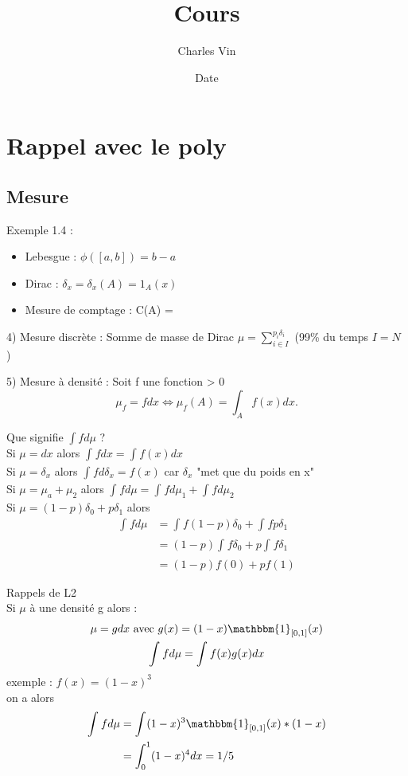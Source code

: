 \documentclass{article}
\title{Cours}
\author{Charles Vin}
\date{Date}
\theoremstyle{plain}%
\theoremstyle{definition}
\theoremstyle{remark}
\begin{document}
\maketitle

\section{Rappel avec le poly}

\subsection{Mesure}
Exemple 1.4 :
\begin{itemize}
    \item Lebesgue :  $ \phi ([a,b]) = b-a $ 
    \item Dirac :  $ \delta_x = \delta_x(A) = 1_A(x)$ 
    \item Mesure de comptage : C(A) =  
\end{itemize}

4) Mesure discrète : Somme de masse de Dirac 
$ \mu = \sum_{i \in I}^{p_i\delta_i} $ (99\% du temps  $ I=N $ )

5) Mesure à densité :
Soit f une fonction > 0 \\ 
\[
    \mu _f = fdx \Leftrightarrow \mu _f(A) = \int_{A} f(x)dx
.\]

Que signifie  $ \int fd \mu  $ ? \\
Si  $ \mu  = dx  $ alors  $ \int_{}^{} fdx = \int_{}^{}f(x)dx$\\
Si  $ \mu  = \delta _x $ alors  $ \int_{}^{}f d \delta _x = f(x)$ car  $ \delta_x  $ "met que du poids en x" \\
Si  $ \mu = \mu _a + \mu _2 $ alors  $ \int_{}^{}f d \mu = \int_{}^{} f d \mu _1 + \int_{}^{} f d \mu _2 $ \\
Si  $ \mu = (1-p) \delta _0 + p \delta _1 $ alors  
\begin{align*}
    \int_{}^{} f d \mu &= \int_{}^{}f (1-p )\delta _0 + \int_{}^{} f p \delta _1 \\
                        &= (1-p)\int_{}^{}f \delta _0 + p \int_{}^{} f \delta _1 \\
                        &= (1-p)f(0) + pf(1)
\end{align*}

Rappels de L2 \\
Si  $ \mu $  à une densité g alors :
\begin{gather*}
    \mu  = gdx \text{ avec } g(x)= (1-x) \mathbbm{1}_{[0,1]}(x) \\
    \int_{}^{}fd \mu  = \int_{}^{} f(x)g(x)dx
\end{gather*}
exemple :  $ f(x) = (1-x)^3 $ \\
on a alors \begin{align*}
    \int_{}^{}fd \mu  &= \int_{}^{} (1-x)^3 \mathbbm{1}_{[0,1]}(x) * (1-x) \\
                    &= \int_{0}^{1}(1-x)^4 dx = 1/5
\end{align*}
\end{document}
